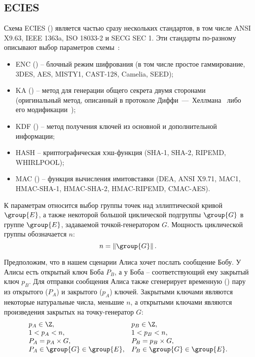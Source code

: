 \subsection{ECIES}

Схема ECIES () является частью сразу нескольких стандартов, в том числе ANSI X9.63, IEEE 1363a, ISO 18033-2 и SECG SEC 1. Эти стандарты по-разному описывают выбор параметров схемы~\cite{Martinez:Encinas:Avila:2010}:

\begin{itemize}
	\item ENC () -- блочный режим шифрования (в том числе простое гаммирование, 3DES, AES, MISTY1, CAST-128, Camelia, SEED);
	\item KA () -- метод для генерации общего секрета двумя сторонами (оригинальный метод, описанный в протоколе Диффи~---~Хеллмана~\cite{Diffie:Hellman:1976} либо его модификации~\cite{Miller:1986});
	\item KDF () -- метод получения ключей из основной и дополнительной информации;
	\item HASH -- криптографическая хэш-функция (SHA-1, SHA-2, RIPEMD, WHIRLPOOL);
	\item MAC () -- функция вычисления имитовставки (DEA, ANSI X9.71, MAC1, HMAC-SHA-1, HMAC-SHA-2, HMAC-RIPEMD, CMAC-AES).
\end{itemize}

К параметрам относится выбор группы точек над эллиптической кривой $\group{E}$, а также некоторой большой циклической подгруппы $\group{G}$ в группе $\group{E}$, задаваемой точкой-генератором $G$. Мощность циклической группы обозначается $n$:
\[n = \left\| \group{G} \right\|.\]

Предположим, что в нашем сценарии Алиса хочет послать сообщение Бобу. У Алисы есть открытый ключ Боба $P_B$, а у Боба -- соответствующий ему закрытый ключ $p_B$. Для отправки сообщения Алиса также сгенерирует временную () пару из открытого ($P_A$) и закрытого ($p_A$) ключей. Закрытыми ключами являются некоторые натуральные числа, меньшие $n$, а открытыми ключами являются произведения закрытых на точку-генератор $G$:
\[ \begin{array}{ll}
	p_A \in \Z, & p_B \in \Z, \\
	1 < p_A < n, & 1 < p_B < n, \\
	P_A = p_A \times G, & P_B = p_B \times G, \\
	P_A \in \group{G} \in \group{E}, & P_B \in \group{G} \in \group{E}.\\
\end{array} \]

